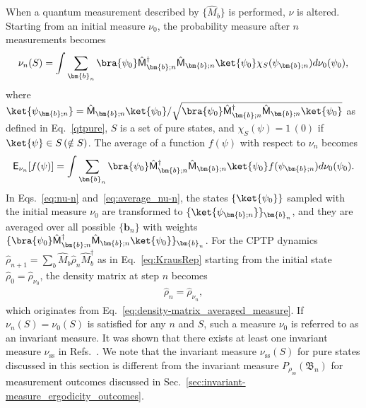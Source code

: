\documentclass[preprint,pteplogo]{ptephy_v2}%
\numberwithin{equation}{section}
\theoremstyle{definition}
\begin{document}
When a quantum measurement described by $\{\hat{M}_b\}$ is performed, $\nu$ is altered. 
Starting from an initial measure $\nu_0$, the probability measure after $n$ measurements becomes
\begin{align}
    \nu_n(S)=\int\sum_{\bm{b}_n}\bra{\psi_0}\hat{\mathsf{M}}_{\bm{b};n}^\dagger \hat{\mathsf{M}}_{\bm{b};n}\ket{\psi_0}\chi_S(\psi_{\bm{b};n})d\nu_0(\psi_0),
    \label{eq:nu-n}
\end{align}
where $\ket{\psi_{\bm{b};n}}=\hat{\mathsf{M}}_{\bm{b};n}\ket{\psi_0}/\sqrt{\bra{\psi_0}\hat{\mathsf{M}}_{\bm{b};n}^\dagger\hat{\mathsf{M}}_{\bm{b};n}\ket{\psi_0}}$ as defined in Eq.~\eqref{qtpure}, $S$ is a set of pure states, and $\chi_S(\psi)=1\,(0)$ if $\ket{\psi} \in S\,(\notin S)$. 
The average of a function $f(\psi)$ with respect to $\nu_n$ becomes  
\begin{align}\label{eq:average_nu-n}
    \mathsf{E}_{\nu_n}[f(\psi)]=\int\sum_{\bm{b}_n}\bra{\psi_0}\hat{\mathsf{M}}_{\bm{b};n}^\dagger \hat{\mathsf{M}}_{\bm{b};n}\ket{\psi_0}f(\psi_{\bm{b};n})d\nu_0(\psi_0).
\end{align}
In Eqs.~\eqref{eq:nu-n} and~\eqref{eq:average_nu-n}, the states $\{\ket{\psi_0}\}$ sampled with the initial measure $\nu_0$ are transformed to $\{\ket{\psi_{\bm{b};n}}\}_{\bm{b}_n}$, and they are averaged over all possible $\{\bm{b}_n\}$ with weights $\{\bra{\psi_0}\hat{\mathsf{M}}_{\bm{b};n}^\dagger \hat{\mathsf{M}}_{\bm{b};n}\ket{\psi_0}\}_{\bm{b}_n}$. 
For the CPTP dynamics $\hat{\rho}_{n+1}=\sum_b\hat{M}_b\hat{\rho}_{n}\hat{M}_b^\dagger$ as in Eq.~\eqref{eq:KrausRep} starting from the initial state $\hat{\rho}_0=\hat{\rho}_{\nu_0}$, the density matrix at step $n$ becomes
\begin{align}
\hat{\rho}_{n}=\hat{\rho}_{\nu_n},
\label{eq:rho_measure}
\end{align}
which originates from Eq.~\eqref{eq:density-matrix_averaged_measure}. 
If $\nu_n(S)=\nu_0(S)$ is satisfied for any $n$ and $S$, such a measure $\nu_0$ is referred to as an invariant measure. 
It was shown that there exists at least one invariant measure $\nu_\mathrm{ss}$ in Refs.~\cite{benoist2019invariant, benoist2023limit}. 
We note that the invariant measure $\nu_\mathrm{ss}(S)$ for pure states discussed in this section is different from the invariant measure $P_{\rho_\mathrm{ss}}(\mathfrak{B}_n)$ for measurement outcomes discussed in Sec.~\ref{sec:invariant-measure_ergodicity_outcomes}.
\end{document}

